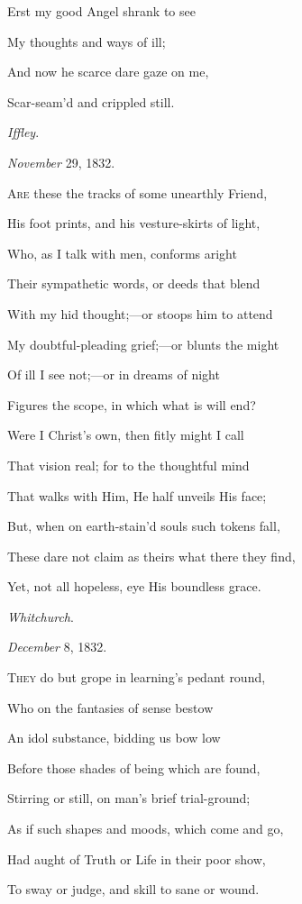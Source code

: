 Erst my good Angel shrank to see

My thoughts and ways of ill;

And now he scarce dare gaze on me,

Scar-seam'd and crippled still.

\emph{Iffley}.

\emph{November} 29, 1832.


A\textsc{re} these the tracks of some unearthly Friend,

His foot prints, and his vesture-skirts of
light,

Who, as I talk with men, conforms aright

Their sympathetic words, or deeds that blend

With my hid thought;—or stoops him to attend

My doubtful-pleading grief;—or blunts the
might

Of ill I see not;—or in dreams of night

Figures the scope, in which what is will end?

Were I Christ's own, then fitly might I call

That vision real; for to the thoughtful mind

That walks with Him, He half unveils His face;

But, when on earth-stain'd souls such tokens fall,

These dare not claim as theirs what there they find,

Yet, not all hopeless, eye His boundless grace.

\emph{Whitchurch}.

\emph{December} 8, 1832.


T\textsc{hey} do but grope in learning's pedant round,

Who on the fantasies of sense bestow

An idol substance, bidding us bow low

Before those shades of being which are found,

Stirring or still, on man's brief trial-ground;

As if such shapes and moods, which come and
go,

Had aught of Truth or Life in their poor
show,

To sway or judge, and skill to sane or wound.

